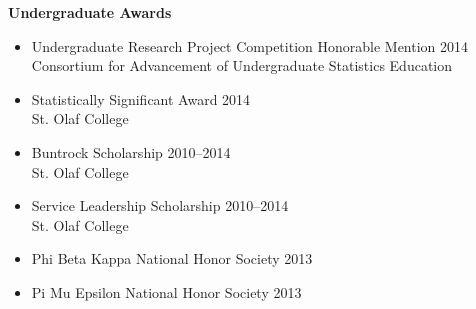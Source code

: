 \documentclass[margin]{res}
\begin{document}
\begin{resume}
\textbf{Undergraduate Awards}
\begin{itemize}
\item Undergraduate Research Project Competition Honorable Mention \hfill 2014  \\
Consortium for Advancement of Undergraduate Statistics Education
\item Statistically Significant Award \hfill 2014 \\
St. Olaf College
\item Buntrock Scholarship \hfill 2010--2014 \\
St. Olaf College 
\item Service Leadership Scholarship \hfill 2010--2014 \\
St. Olaf College 
\item Phi Beta Kappa National Honor Society \hfill 2013 
\item Pi Mu Epsilon National Honor Society \hfill 2013 \\
\end{itemize}



\end{resume}
\end{document}
